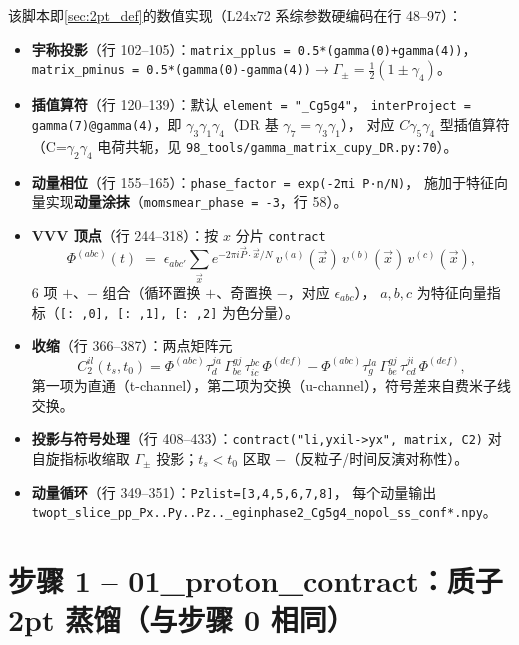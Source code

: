 \documentclass[UTF8,11pt]{ctexart}
\begin{document}
该脚本即\ref{sec:2pt_def}的数值实现（L24x72 系综参数硬编码在行 48--97）：
\begin{itemize}
  \item \textbf{宇称投影}（行 102--105）：\texttt{matrix\_pplus = 0.5*(gamma(0)+gamma(4))}，
  \texttt{matrix\_pminus = 0.5*(gamma(0)-gamma(4))}$\to\Gamma_\pm=\tfrac12(1\pm\gamma_4)$。
  \item \textbf{插值算符}（行 120--139）：默认 \texttt{element = "\_Cg5g4"}，
  \texttt{interProject = gamma(7)@gamma(4)}，即 $\gamma_3\gamma_1\gamma_4$（DR 基 $\gamma_7=\gamma_3\gamma_1$），
  对应 $C\gamma_5\gamma_4$ 型插值算符（C=$\gamma_2\gamma_4$ 电荷共轭，见 \texttt{98\_tools/gamma\_matrix\_cupy\_DR.py:70}）。
  \item \textbf{动量相位}（行 155--165）：\texttt{phase\_factor = exp(-2πi P·n/N)}，
  施加于特征向量实现\textbf{动量涂抹}（\texttt{momsmear\_phase = -3}，行 58）。
  \item \textbf{VVV 顶点}（行 244--318）：按 $x$ 分片 \texttt{contract}
  \begin{equation*}
    \Phi^{(abc)}(t)\;=\;\epsilon_{abc'}\sum_{\vec x}
    e^{-2\pi i\vec P\cdot\vec x/N}\,
    v^{(a)}(\vec x)\, v^{(b)}(\vec x)\, v^{(c)}(\vec x),
  \end{equation*}
  6 项 $+$、$-$ 组合（循环置换 $+$、奇置换 $-$，对应 $\epsilon_{abc}$），
  $a,b,c$ 为特征向量指标（\texttt{[: ,0], [: ,1], [: ,2]} 为色分量）。
  \item \textbf{收缩}（行 366--387）：两点矩阵元
  \begin{equation*}
    C_2^{il}(t_s,t_0)=\Phi^{(abc)}\tau^{ja}_d\,\Gamma^{gj}_{be}\,\tau^{bc}_{ic}\,\Phi^{(def)}
    - \Phi^{(abc)}\tau^{la}_g\,\Gamma^{gj}_{be}\,\tau^{ji}_{cd}\,\Phi^{(def)},
  \end{equation*}
  第一项为直通（t-channel），第二项为交换（u-channel），符号差来自费米子线交换。
  \item \textbf{投影与符号处理}（行 408--433）：\texttt{contract("li,yxil->yx", matrix, C2)}
  对自旋指标收缩取 $\Gamma_\pm$ 投影；$t_s<t_0$ 区取 $-$（反粒子/时间反演对称性）。
  \item \textbf{动量循环}（行 349--351）：\texttt{Pzlist=[3,4,5,6,7,8]}，
  每个动量输出 \texttt{twopt\_slice\_pp\_Px..Py..Pz..\_eginphase2\_Cg5g4\_nopol\_ss\_conf*.npy}。
\end{itemize}

\section{步骤 1 -- 01\_proton\_contract：质子 2pt 蒸馏（与步骤 0 相同）}
\label{sec:step1}
\end{document}
